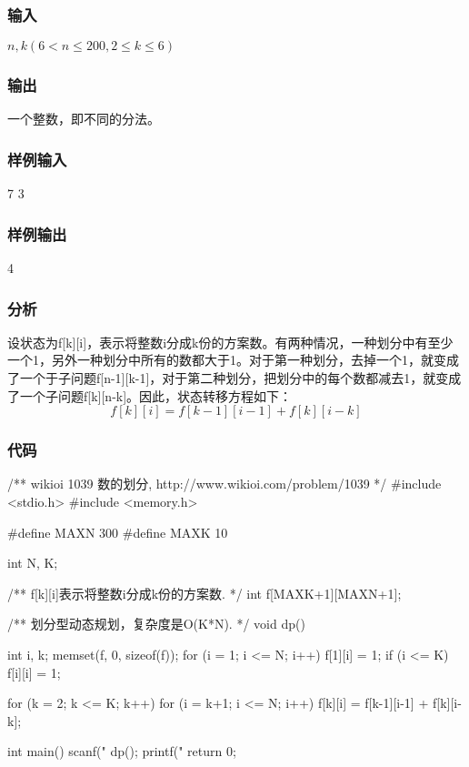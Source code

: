 \subsubsection{输入}
$n,k (6<n \leq 200,2 \leq k \leq 6)$

\subsubsection{输出}
一个整数，即不同的分法。

\subsubsection{样例输入}
\begin{Code}
7 3
\end{Code}

\subsubsection{样例输出}
\begin{Code}
4
\end{Code}

\subsubsection{分析}
设状态为f[k][i]，表示将整数i分成k份的方案数。有两种情况，一种划分中有至少一个1，另外一种划分中所有的数都大于1。对于第一种划分，去掉一个1，就变成了一个于子问题f[n-1][k-1]，对于第二种划分，把划分中的每个数都减去1，就变成了一个子问题f[k][n-k]。因此，状态转移方程如下：
$$
f[k][i] = f[k-1][i-1] + f[k][i-k]
$$

\subsubsection{代码}

\begin{Codex}[label=integer_partition.c]
/** wikioi 1039 数的划分, http://www.wikioi.com/problem/1039 */
#include <stdio.h>
#include <memory.h>

#define MAXN 300
#define MAXK 10

int N, K;

/** f[k][i]表示将整数i分成k份的方案数. */
int f[MAXK+1][MAXN+1];

/** 划分型动态规划，复杂度是O(K*N). */
void dp() {
    int i, k;
    memset(f, 0, sizeof(f));
    for (i = 1; i <= N; i++) {
        f[1][i] = 1;
        if (i <= K) f[i][i] = 1;
    }

    for (k = 2; k <= K; k++) {
        for (i = k+1; i <= N; i++) {
            f[k][i] = f[k-1][i-1] + f[k][i-k];
        }
    }
}

int main() {
    scanf("%
    dp();
    printf("%
    return 0;
}
\end{Codex}

